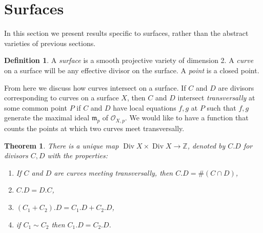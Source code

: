\documentclass[12pt,twoside]{reedthesis}
\theoremstyle{plain}
\newtheorem{theorem}{Theorem}[chapter]
\theoremstyle{definition}
\newtheorem{definition}{Definition}[section]
\theoremstyle{remark}
\newcommand{\ZZ}{\mathbb{Z}}
\newcommand{\calO}{\mathcal{O}}
\newcommand{\Div}{\operatorname{Div}}
\begin{document}
\section{Surfaces}
In this section we present results specific to surfaces, rather than the abstract varieties of previous sections.
\begin{definition}
A \emph{surface} is a smooth projective variety of dimension 2. A \emph{curve} on a surface will be any effective divisor on the surface. A \emph{point} is a closed point.
\end{definition}

From here we discuss how curves intersect on a surface. If $C$ and $D$ are divisors corresponding to curves on a surface $X$, then $C$ and $D$ intersect \emph{transversally} at some common point $P$ if $C$ and $D$ have local equations $f,g$ at $P$ such that $f,g$ generate the maximal ideal $\mathfrak{m}_p$ of $\calO_{X,p}$. We would like to have a function that counts the points at which two curves meet transversally.
\begin{theorem}
There is a unique map $\Div X\times \Div X\to\ZZ$, denoted by $C.D$ for divisors $C,D$ with the properties:
\begin{enumerate}
\item If $C$ and $D$ are curves meeting transversally, then $C.D=\#(C\cap D)$,
\item $C.D=D.C$,
\item $(C_1+C_2).D=C_1.D+C_2.D$,
\item if $C_1\sim C_2$ then $C_1.D=C_2.D$.
\end{enumerate}
\end{theorem}
\end{document}
